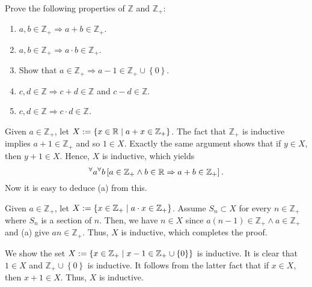 \documentclass[a4paper,12pt]{article}
\begin{document}
\begin{exe}
	Prove the following properties of \( \mathbb{Z} \) and \( \mathbb{Z}_{+} \):
	\begin{enumerate}
		\item
		      \( a,b \in \mathbb{Z}_{+} \Rightarrow a+b \in \mathbb{Z}_{+}\).
		      
		\item
		      \( a,b \in \mathbb{Z}_{+} \Rightarrow a \cdot b \in \mathbb{Z}_{+}\).
		      
		\item
		      Show that
		      \( a\in \mathbb{Z}_{+} \Rightarrow a-1 \in \mathbb{Z}_{+} \cup \left\{ 0 \right\} \).
		      
		\item
		      \( c,d \in \mathbb{Z} \Rightarrow c+d \in \mathbb{Z} \)
		      and
		      \( c-d \in \mathbb{Z} \).
		      
		\item
		      \( c,d \in \mathbb{Z} \Rightarrow c \cdot d \in \mathbb{Z} \).
	\end{enumerate}
\end{exe}\begin{sol}\leavevmode \par
	Given
	\( a \in \mathbb{Z}_{+} \),
	let
	\( X:=\left\{x \in \mathbb{R} \;|\; a+x \in \mathbb{Z}_{+} \right\} \).
	The fact that 
	\( \mathbb{Z}_{+} \)
	is inductive implies
	\( a+1 \in \mathbb{Z}_{+} \)
	and so
	\( 1\in X \).
	Exactly the same argument shows that
	if
	\( y \in X \),
	then
	\( y+1 \in X \).
	Hence,
	\( X \)
	is inductive,
	which yields
	\begin{equation*}
		{}^{\forall}  a
		{}^{\forall}  b
		\left[
			a\in \mathbb{Z}_{+} \wedge b \in \mathbb{R}
			\Rightarrow
			a+b \in \mathbb{Z}_{+}
			\right].
	\end{equation*}
	Now it is easy to deduce (a) from this.
	
	Given
	\( a \in \mathbb{Z}_{+} \),
	let
	\( X:=\left\{x \in \mathbb{Z}_{+} \;|\;
	a \cdot	x \in \mathbb{Z}_{+} \right\} \).
	Assume
	\( S_n \subset X \)
	for every
	\( n \in \mathbb{Z}_{+} \)
	where
	\( S_n \)
	is a section of
	\( n \).
	Then,
	we have
	\( n \in X\)
	since
	\( a(n-1)\in \mathbb{Z}_{+} \wedge a \in \mathbb{Z}_{+} \)
	and (a) give
	\( an \in \mathbb{Z}_{+} \).
	Thus,
	\( X \)
	is inductive, which completes the proof.
	
	We show the set
	\( X:=	\left\{  x \in \mathbb{Z}_{+} \;|\;
	x-1 \in \mathbb{Z}_{+} \cup \left\{ 0 \right\}
	\right\} \)
	is inductive.
	It is clear that
	\( 1\in X \)
	and 
	\( \mathbb{Z}_{+} \cup \left\{ 0 \right\} \)
	is inductive.
	It follows from the latter fact that if
	\( x\in X \),
	then 
	\( x+1 \in X \).
	Thus,
	\( X \)
	is inductive.
	

\end{sol}
\end{document}
